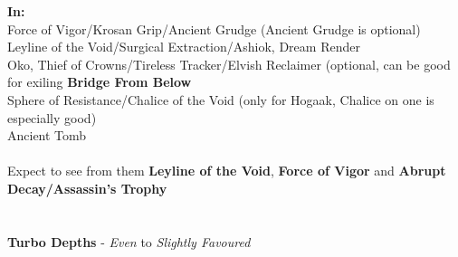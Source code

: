\documentclass{report}
\begin{document}
\textbf{In:}\\
Force of Vigor/Krosan Grip/Ancient Grudge (Ancient Grudge is optional)\\Leyline of the Void/Surgical Extraction/Ashiok, Dream Render\\Oko, Thief of Crowns/Tireless Tracker/Elvish Reclaimer (optional, can be good for exiling \textbf{Bridge From Below}\\Sphere of Resistance/Chalice of the Void (only for Hogaak, Chalice on one is especially good)\\Ancient Tomb\\\\
Expect to see from them \textbf{Leyline of the Void}, \textbf{Force of Vigor} and \textbf{Abrupt Decay/Assassin's Trophy}\\\\\\
\textbf{Turbo Depths} - \emph{Even} to \emph{Slightly Favoured}\\
\end{document}
